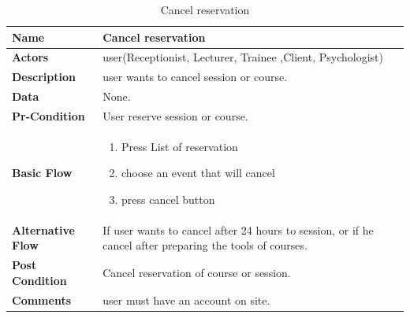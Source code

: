 \documentclass[../Psychological_system_web_application.tex]{subfiles}
\begin{document}
	\begin{center}
		\begin{table}[h!]
			\begin{tabular}{ | m{4cm} | m{10cm}| } 
				\hline
			 	\textbf{\large Name}& Cancel reservation\\ 
				\hline
			  	\textbf{\large Actors}& user(Receptionist, Lecturer, Trainee ,Client, Psychologist)\\ 
				\hline
			  	\textbf{\large Description}& user wants to cancel session or course.\\ 
				\hline
				\textbf{\large Data}& None.\\ 
				\hline
				 \textbf{\large Pr-Condition}& User reserve session or course. \\ 
				\hline
				\textbf{\large Basic Flow}&\begin{enumerate}
				\item
					Press List of reservation
				\item
					choose an event that will cancel
				\item 
					press cancel button \end{enumerate}\\
					\hline
				\textbf{\large Alternative Flow}& If user wants to cancel after 24 hours to session, or if he cancel after preparing the tools of courses.\\ 
				\hline
				\textbf{\large Post Condition}& Cancel reservation of course or session.\\ 
				\hline
				\textbf{\large Comments}& user must have an account on site.\\ 
				\hline
			\end{tabular}
			\caption{Cancel reservation}
			\label{table:CANCEL-RESERVATION}
		\end{table}
	\end{center}
	
\end{document}
